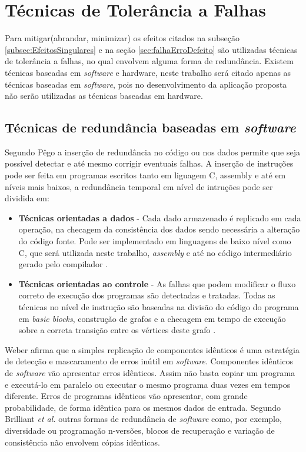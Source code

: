 \documentclass[a4paper,12pt,brazil]{ufms-cpcx}
\begin{document}
\section{Técnicas de Tolerância a Falhas}


Para mitigar(abrandar, minimizar) os efeitos citados na subseção \ref{subsec:EfeitosSingulares} e na seção \ref{sec:falhaErroDefeito} são utilizadas técnicas de tolerância a falhas, no qual envolvem alguma forma de redundância.  
Existem técnicas baseadas em \textit{software} e hardware, neste trabalho será citado apenas as técnicas baseadas em \textit{software}, pois no desenvolvimento da aplicação proposta não serão utilizadas as técnicas baseadas em hardware.

\subsection{Técnicas de redundância baseadas em \textit{software}}

Segundo Pêgo \cite{Pego:2014} a inserção de redundância no código ou nos dados permite que seja possível detectar e até mesmo corrigir eventuais falhas. A inserção de instruções pode ser feita em programas escritos tanto em liguagem C, assembly e até em níveis mais baixos, a redundância temporal em nível de intruções pode ser dividida em:


\begin{itemize}
	\item \textbf{Técnicas orientadas a dados} - Cada dado armazenado é replicado em cada operação, na checagem da consistência dos dados sendo necessária a alteração do código fonte. Pode ser implementado em linguagens de baixo nível como C, que será utilizada neste trabalho, \textit{assembly} e até no código intermediário gerado pelo compilador \cite{Pego:2014}.
	
	\item \textbf{Técnicas orientadas ao controle} - As falhas que podem modificar o fluxo correto de execução dos programas são detectadas e tratadas. Todas as técnicas no nível de instrução são baseadas na divisão do código do programa em \textit{basic blocks}, construção de grafos e a checagem em tempo de execução sobre a correta transição entre os vértices deste grafo \cite{Pego:2014}.  		 
	
\end{itemize}


Weber \cite{Weber:2002} afirma que a simples replicação de componentes idênticos é uma estratégia de detecção e mascaramento de erros inútil em \textit{software}. Componentes idênticos de \textit{software} vão apresentar erros idênticos. Assim não basta copiar um programa e executá-lo em paralelo ou executar o mesmo programa duas vezes em tempos diferente. Erros de programas idênticos vão apresentar, com grande probabilidade, de forma idêntica para os mesmos dados de entrada. Segundo Brilliant \textit{et al.} outras formas de redundância de \textit{software} como, por exemplo, diversidade ou programação n-versões, blocos de recuperação e variação de consistência não envolvem cópias idênticas.
 
\end{document}
